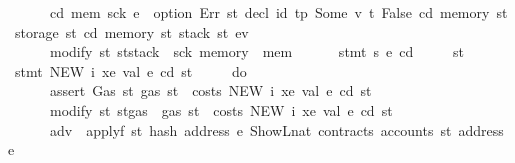 \begin{isabellebody}
\ \ \ \ \ \ {\isacharparenleft}{\kern0pt}cd{\isacharprime}{\kern0pt}{\isacharcomma}{\kern0pt}\ mem{\isacharprime}{\kern0pt}{\isacharcomma}{\kern0pt}\ sck{\isacharprime}{\kern0pt}{\isacharcomma}{\kern0pt}\ e{\isacharprime}{\kern0pt}{\isacharparenright}{\kern0pt}\ {\isasymleftarrow}\ option\ Err\ {\isacharparenleft}{\kern0pt}{\isasymlambda}st{\isachardot}{\kern0pt}\ decl\ id{}\ tp\ {\isacharparenleft}{\kern0pt}Some\ {\isacharparenleft}{\kern0pt}v{\isacharcomma}{\kern0pt}\ t{\isacharparenright}{\kern0pt}{\isacharparenright}{\kern0pt}\ False\ cd\ {\isacharparenleft}{\kern0pt}memory\ st{\isacharparenright}{\kern0pt}\ {\isacharparenleft}{\kern0pt}storage\ st{\isacharparenright}{\kern0pt}\ {\isacharparenleft}{\kern0pt}cd{\isacharcomma}{\kern0pt}\ memory\ st{\isacharcomma}{\kern0pt}\ stack\ st{\isacharcomma}{\kern0pt}\ e\isactrlsub v{\isacharparenright}{\kern0pt}{\isacharparenright}{\kern0pt}{\isacharsemicolon}{\kern0pt}\isanewline
\ \ \ \ \ \ modify\ {\isacharparenleft}{\kern0pt}{\isasymlambda}st{\isachardot}{\kern0pt}\ st{\isasymlparr}stack\ {\isacharcolon}{\kern0pt}{\isacharequal}{\kern0pt}\ sck{\isacharprime}{\kern0pt}{\isacharcomma}{\kern0pt}\ memory\ {\isacharcolon}{\kern0pt}{\isacharequal}{\kern0pt}\ mem{\isacharprime}{\kern0pt}{\isasymrparr}{\isacharparenright}{\kern0pt}{\isacharsemicolon}{\kern0pt}\isanewline
\ \ \ \ \ \ stmt\ s\ e{\isacharprime}{\kern0pt}\ cd{\isacharprime}{\kern0pt}\isanewline
\ \ \ \ {\isacharbraceright}{\kern0pt}{\isacharparenright}{\kern0pt}\ st{\isachardoublequoteclose}\isanewline
\isanewline
{\isacharbar}{\kern0pt}\ {\isachardoublequoteopen}stmt\ {\isacharparenleft}{\kern0pt}NEW\ i\ xe\ val{\isacharparenright}{\kern0pt}\ e\ cd\ st\ {\isacharequal}{\kern0pt}\isanewline
\ \ \ \ {\isacharparenleft}{\kern0pt}do\ {\isacharbraceleft}{\kern0pt}\isanewline
\ \ \ \ \ \ assert\ Gas\ {\isacharparenleft}{\kern0pt}{\isasymlambda}st{\isachardot}{\kern0pt}\ gas\ st\ {\isachargreater}{\kern0pt}\ costs\ {\isacharparenleft}{\kern0pt}NEW\ i\ xe\ val{\isacharparenright}{\kern0pt}\ e\ cd\ st{\isacharparenright}{\kern0pt}{\isacharsemicolon}{\kern0pt}\isanewline
\ \ \ \ \ \ modify\ {\isacharparenleft}{\kern0pt}{\isasymlambda}st{\isachardot}{\kern0pt}\ st{\isasymlparr}gas\ {\isacharcolon}{\kern0pt}{\isacharequal}{\kern0pt}\ gas\ st\ {\isacharminus}{\kern0pt}\ costs\ {\isacharparenleft}{\kern0pt}NEW\ i\ xe\ val{\isacharparenright}{\kern0pt}\ e\ cd\ st{\isasymrparr}{\isacharparenright}{\kern0pt}{\isacharsemicolon}{\kern0pt}\isanewline
\ \ \ \ \ \ adv\ {\isasymleftarrow}\ applyf\ {\isacharparenleft}{\kern0pt}{\isasymlambda}st{\isachardot}{\kern0pt}\ hash\ {\isacharparenleft}{\kern0pt}address\ e{\isacharparenright}{\kern0pt}\ {\isacharparenleft}{\kern0pt}ShowL\isactrlsub n\isactrlsub a\isactrlsub t\ {\isacharparenleft}{\kern0pt}contracts\ {\isacharparenleft}{\kern0pt}accounts\ st\ {\isacharparenleft}{\kern0pt}address\ e{\isacharparenright}{\kern0pt}{\isacharparenright}{\kern0pt}{\isacharparenright}{\kern0pt}{\isacharparenright}{\kern0pt}{\isacharparenright}{\kern0pt}{\isacharsemicolon}{\kern0pt}\isanewline

\end{isabellebody}
